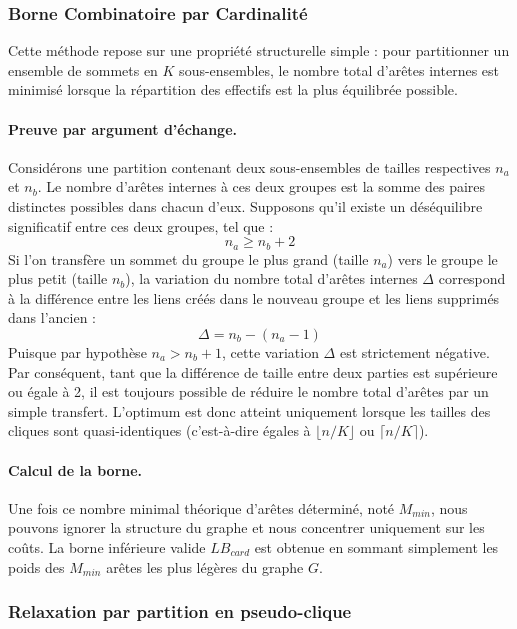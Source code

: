 \documentclass{article}
\begin{document}
\subsubsection{Borne Combinatoire par Cardinalité}

Cette méthode repose sur une propriété structurelle simple : pour partitionner un ensemble de sommets en $K$ sous-ensembles, le nombre total d'arêtes internes est minimisé lorsque la répartition des effectifs est la plus équilibrée possible.

\paragraph{Preuve par argument d'échange.}
Considérons une partition contenant deux sous-ensembles de tailles respectives $n_a$ et $n_b$. Le nombre d'arêtes internes à ces deux groupes est la somme des paires distinctes possibles dans chacun d'eux.
Supposons qu'il existe un déséquilibre significatif entre ces deux groupes, tel que :
$$ n_a \ge n_b + 2 $$
Si l'on transfère un sommet du groupe le plus grand (taille $n_a$) vers le groupe le plus petit (taille $n_b$), la variation du nombre total d'arêtes internes $\Delta$ correspond à la différence entre les liens créés dans le nouveau groupe et les liens supprimés dans l'ancien :
$$ \Delta = n_b - (n_a - 1) $$
Puisque par hypothèse $n_a > n_b + 1$, cette variation $\Delta$ est strictement négative.
Par conséquent, tant que la différence de taille entre deux parties est supérieure ou égale à 2, il est toujours possible de réduire le nombre total d'arêtes par un simple transfert. L'optimum est donc atteint uniquement lorsque les tailles des cliques sont quasi-identiques (c'est-à-dire égales à $\lfloor n/K \rfloor$ ou $\lceil n/K \rceil$).

\paragraph{Calcul de la borne.}
Une fois ce nombre minimal théorique d'arêtes déterminé, noté $M_{min}$, nous pouvons ignorer la structure du graphe et nous concentrer uniquement sur les coûts. La borne inférieure valide $LB_{card}$ est obtenue en sommant simplement les poids des $M_{min}$ arêtes les plus légères du graphe $G$.

\subsubsection{Relaxation par partition en pseudo-clique}
\end{document}
